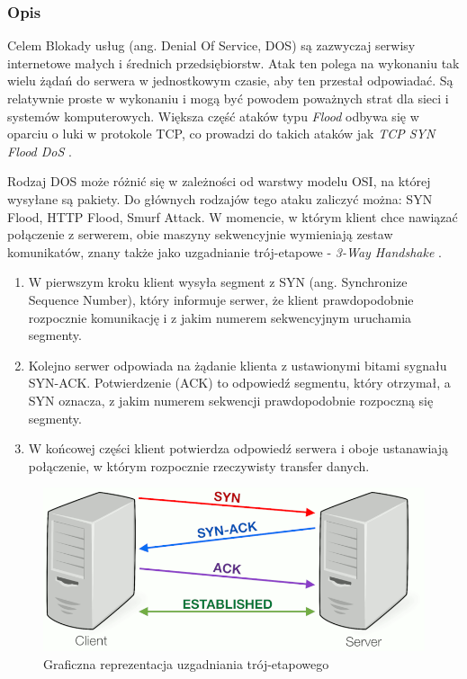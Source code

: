 \documentclass[12pt,twoside]{article}
\begin{document}
\subsubsection{Opis}
Celem Blokady usług (ang. Denial Of Service, DOS) są zazwyczaj serwisy internetowe małych i średnich przedsiębiorstw. Atak ten polega na wykonaniu tak wielu żądań do serwera w jednostkowym czasie, aby ten przestał odpowiadać. Są relatywnie proste w wykonaniu i mogą być powodem poważnych strat dla sieci i systemów komputerowych. Większa część ataków typu \emph{Flood} odbywa się w oparciu o luki w protokole TCP, co prowadzi do takich ataków jak \emph{TCP SYN Flood DoS} \cite{Ddos}.

Rodzaj DOS może różnić się w zależności od warstwy modelu OSI, na której wysyłane są pakiety. Do głównych rodzajów tego ataku zaliczyć można: SYN Flood, HTTP Flood, Smurf Attack. W momencie, w którym klient chce nawiązać połączenie z serwerem, obie maszyny sekwencyjnie wymieniają zestaw komunikatów, znany także jako uzgadnianie trój-etapowe - \emph{3-Way Handshake} \cite{3WayHandshake}. 

\begin{enumerate}
	\item W pierwszym kroku klient wysyła segment z SYN (ang. Synchronize Sequence Number), który informuje serwer, że klient prawdopodobnie rozpocznie komunikację i z jakim numerem sekwencyjnym uruchamia segmenty.
	\item Kolejno serwer odpowiada na żądanie klienta z ustawionymi bitami sygnału SYN-ACK. Potwierdzenie (ACK) to odpowiedź segmentu, który otrzymał, a SYN oznacza, z jakim numerem sekwencji prawdopodobnie rozpoczną się segmenty.
	\item W końcowej części klient potwierdza odpowiedź serwera i oboje ustanawiają połączenie, w którym rozpocznie rzeczywisty transfer danych.
\end{enumerate}


\begin{figure}[H]
	\centering
	\includegraphics[width=0.7\linewidth]{figures/3-way-handshake}
	\caption{Graficzna reprezentacja uzgadniania trój-etapowego}
	\label{fig:3-way-handshake}
\end{figure}
\end{document}
